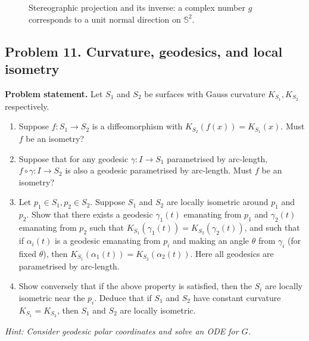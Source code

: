 \documentclass[12pt,a4paper]{article}
\theoremstyle{plain}
\theoremstyle{definition}      %
\begin{document}
\begin{figure}[H]
		\caption{Stereographic projection and its inverse: a complex number $g$ corresponds to a unit normal direction on $\mathbb S^2$.}
	\end{figure}
	
	\clearpage
	
		\subsection*{Problem 11. Curvature, geodesics, and local isometry}
	
	\textbf{Problem statement.}
	Let $S_1$ and $S_2$ be surfaces with Gauss curvature $K_{S_1}, K_{S_2}$ respectively.
	\begin{enumerate}
		\item Suppose $f:S_1\to S_2$ is a diffeomorphism with $K_{S_2}(f(x))=K_{S_1}(x)$. Must $f$ be an isometry?
		\item Suppose that for any geodesic $\gamma:I\to S_1$ parametrised by arc-length, $f\circ\gamma:I\to S_2$ is also a geodesic
		parametrised by arc-length. Must $f$ be an isometry?
		\item Let $p_1\in S_1, p_2\in S_2$. Suppose $S_1$ and $S_2$ are locally isometric around $p_1$ and $p_2$.
		Show that there exists a geodesic $\gamma_1(t)$ emanating from $p_1$ and $\gamma_2(t)$ emanating from $p_2$ such that
		$K_{S_1}(\gamma_1(t))=K_{S_2}(\gamma_2(t))$, and such that if $\alpha_i(t)$ is a geodesic emanating from $p_i$ and making an
		angle $\theta$ from $\gamma_i$ (for fixed $\theta$), then $K_{S_1}(\alpha_1(t))=K_{S_2}(\alpha_2(t))$.
		Here all geodesics are parametrised by arc-length.
		\item Show conversely that if the above property is satisfied, then the $S_i$ are locally isometric near the $p_i$.
		Deduce that if $S_1$ and $S_2$ have constant curvature $K_{S_1}=K_{S_2}$, then $S_1$ and $S_2$ are locally isometric.
	\end{enumerate}
	\hfill\textit{Hint: Consider geodesic polar coordinates and solve an ODE for $G$.}
	
\end{document}
